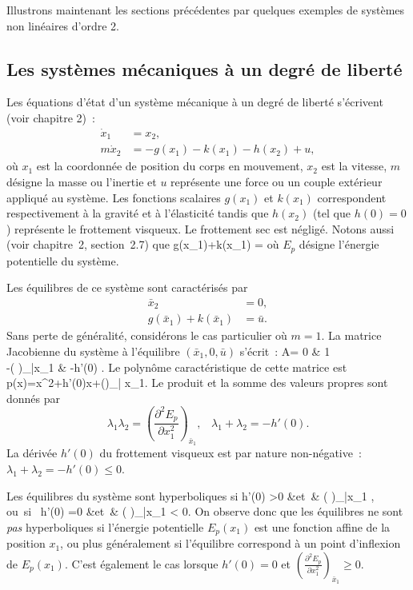 Illustrons maintenant les sections précédentes par quelques exemples de systèmes non
linéaires d'ordre 2.



\subsection{ Les systèmes mécaniques à un degré de
liberté}

Les {é}quations d'{é}tat d'un syst{è}me m{é}canique {à} un degr{é} de libert{é}
 s'{é}crivent (voir chapitre 2)~:
\begin{align*}
\dot x_1&=x_2,\\
m\dot x_2&=-g(x_1) -k(x_1)-h(x_2) + u,
\end{align*}
o{ù} $x_1$ est la coordonn{é}e de position du corps en mouvement, $x_2$ est la vitesse, $m$ d{é}signe la masse ou l'inertie et $u$ repr{é}sente une force ou un couple 
ext{é}rieur appliqu{é} au syst{è}me. Les fonctions scalaires $g(x_1)$ et $k(x_1)$ 
correspondent respectivement {à} la gravit{é} et
{à} l'élasticité tandis que $h(x_2)$ (tel que $h(0)=0$) repr{é}sente le frottement
visqueux. Le frottement sec est n{é}glig{é}. Notons aussi (voir chapitre~2, section~2.7) que 
\eqnn
g(x_1)+k(x_1) = 
\eeqnn
o{ù} $E_p$ d{é}signe l'{é}nergie potentielle du syst{è}me. 

Les {é}quilibres de ce syst{è}me sont caract{é}ris{é}s par
\begin{align*}
\bar x_2 &= 0,\\
g(\bar x_1)+k(\bar x_1) &= \bar u.
\end{align*}
Sans perte de généralité, considérons le cas particulier où $m=1$. La matrice Jacobienne du syst{è}me {à} l'{é}quilibre $(\bar x_1, 0,\bar
u)$ s'{é}crit~: 
\eqnn
 A= 0 & 1\\-\left (\right
)_{\bar x_1} & -h'(0) \ema.
\eeqnn
Le polyn{\^o}me caract{é}ristique de cette matrice est
\eqnn
p(x)=x^2+h'(0)x+\left (\right )_{\bar
x_1}.
\eeqnn
 Le produit et la somme des valeurs propres sont donn{é}s par
$$ \lambda_1\lambda_2=\left (\frac{\partial^2E_p}{\partial x_1^2}\right
)_{\bar x_1}, \;\;\; \lambda_1+\lambda_2=-h'(0).$$
La d{é}riv{é}e $h'(0)$ du frottement visqueux est 
par nature non-n{é}gative~: $\lambda_1+\lambda_2 =-h'(0) \leq 0$.




Les {é}quilibres du syst{è}me sont hyperboliques si
 \eqnn 
h'(0) >0 &\mbox{et }&  \left (\right
)_{\bar x_1} ,\\
 \mbox{ou si }  h'(0) =0 &\mbox{et }& \left (\right
)_{\bar x_1} < 0.
\eeqnn
On observe donc que les {é}quilibres ne sont {\em pas} hyperboliques si l'{é}nergie potentielle $E_p(x_1)$ est une fonction affine de la position $x_1$, ou plus g{é}n{é}ralement si l'{é}quilibre correspond {à} un point d'inflexion de $E_p(x_1)$. C'est {é}galement le cas lorsque  $h'(0)=0$ et $\left (\frac{\partial^2E_p}{\partial
x_1^2}\right )_{\bar x_1} \geq 0$.

